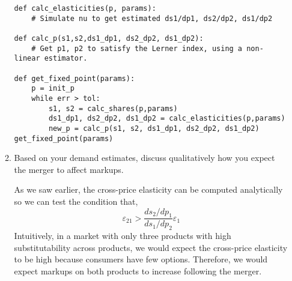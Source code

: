 \documentclass{article}
\begin{document}
\begin{enumerate}
\begin{enumerate}
\begin{answer}
\begin{verbatim}
def calc_elasticities(p, params):
    # Simulate nu to get estimated ds1/dp1, ds2/dp2, ds1/dp2 

def calc_p(s1,s2,ds1_dp1, ds2_dp2, ds1_dp2):
    # Get p1, p2 to satisfy the Lerner index, using a non-linear estimator.

def get_fixed_point(params):
    p = init_p 
    while err > tol:
        s1, s2 = calc_shares(p,params)
        ds1_dp1, ds2_dp2, ds1_dp2 = calc_elasticities(p,params)
        new_p = calc_p(s1, s2, ds1_dp1, ds2_dp2, ds1_dp2)
get_fixed_point(params)
\end{verbatim}
\end{answer}

\item Based on your demand estimates, discuss qualitatively how you expect the merger
to affect markups.
\begin{answer}
As we saw earlier, the cross-price elasticity can be computed analytically so we can test the condition that,
$$\varepsilon_{21} > \frac{ds_2/dp_1}{ds_1/dp_2}\varepsilon_1$$
Intuitively, in a market with only three products with high substitutability across products, we would expect the cross-price elasticity to be high because consumers have few options. Therefore, we would expect markups on both products to increase following the merger. 
\end{answer}

\end{enumerate}
\end{enumerate}
\end{document}

